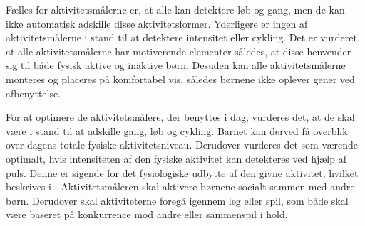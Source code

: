 Fælles for aktivitetsmålerne er, at alle kan detektere løb og gang, men de kan ikke automatisk adskille disse aktivitetsformer. Yderligere er ingen af aktivitetsmålerne i stand til at detektere intensitet eller cykling. Det er vurderet, at alle aktivitetsmålerne har motiverende elementer således, at disse henvender sig til både fysisk aktive og inaktive børn. Desuden kan alle aktivitetsmålerne monteres og placeres på komfortabel vis, således børnene ikke oplever gener ved afbenyttelse.

For at optimere de aktivitetsmålere, der benyttes i dag, vurderes det, at de skal være i stand til at adskille gang, løb og cykling. Barnet kan derved få overblik over dagens totale fysiske aktivitetsniveau. Derudover vurderes det som værende optimalt, hvis intensiteten af den fysiske aktivitet kan detekteres ved hjælp af puls. Denne er sigende for det fysiologiske udbytte af den givne aktivitet, hvilket beskrives i . Aktivitetsmåleren skal aktivere børnene socialt sammen med andre børn. Derudover skal aktiviteterne foregå igennem leg eller spil, som både skal være baseret på konkurrence mod andre eller sammenspil i hold. 
